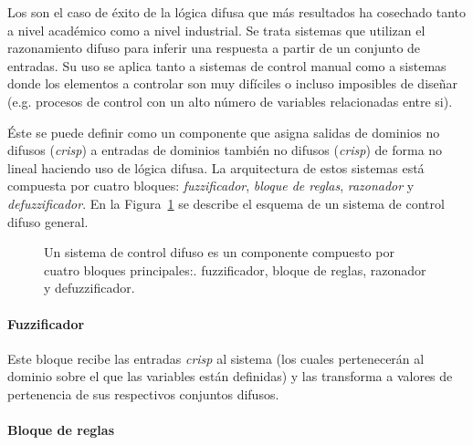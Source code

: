 Los  son el caso de éxito de la lógica difusa que más resultados ha cosechado tanto a nivel académico como a nivel industrial. Se trata sistemas que utilizan el razonamiento difuso para inferir una respuesta a partir de un conjunto de entradas. Su uso se aplica tanto a sistemas de control manual como a sistemas donde los elementos a controlar son muy difíciles o incluso imposibles de diseñar (e.g. procesos de control con un alto número de variables relacionadas entre si).

Éste se puede definir como un componente que asigna salidas de dominios no difusos (\textit{crisp}) a entradas de dominios también no difusos (\textit{crisp}) de forma no lineal haciendo uso de lógica difusa. La arquitectura de estos sistemas está compuesta por cuatro bloques: \textit{fuzzificador}, \textit{bloque de reglas}, \textit{razonador} y \textit{defuzzificador}. En la Figura~\ref{fig:fuzzy-control-system} se describe el esquema de un sistema de control difuso general.

\begin{figure}[t]
	\centering
	\caption[Esquema de un sistema de control difuso]{Un sistema de control difuso es un componente compuesto por cuatro bloques principales:. fuzzificador, bloque de reglas, razonador y defuzzificador.}
	\label{fig:fuzzy-control-system}
\end{figure}

\paragraph{Fuzzificador}

Este bloque recibe las entradas \textit{crisp} al sistema (los cuales pertenecerán al dominio sobre el que las variables están definidas) y las transforma a valores de pertenencia de sus respectivos conjuntos difusos.

\paragraph{Bloque de reglas}

